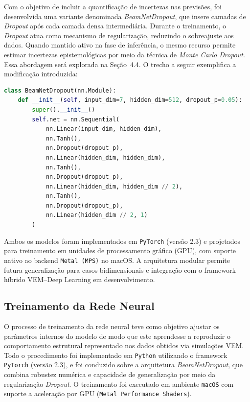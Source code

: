 \documentclass[12pt,openright,oneside,a4paper,english,brazil]{abntex2}
\begin{document}
Com o objetivo de incluir a quantificação de incertezas nas previsões, foi desenvolvida uma variante denominada \textit{BeamNetDropout}, que insere camadas de \textit{Dropout} após cada camada densa intermediária. Durante o treinamento, o \textit{Dropout} atua como mecanismo de regularização, reduzindo o sobreajuste aos dados. Quando mantido ativo na fase de inferência, o mesmo recurso 
permite estimar incertezas epistemológicas por meio da técnica de \textit{Monte Carlo Dropout}. Essa abordagem será explorada na Seção~4.4. O trecho a seguir exemplifica a modificação introduzida:

\begin{lstlisting}[language=Python, caption={Variante BeamNetDropout com regularização e suporte à quantificação de incerteza.}]
class BeamNetDropout(nn.Module):
    def __init__(self, input_dim=7, hidden_dim=512, dropout_p=0.05):
        super().__init__()
        self.net = nn.Sequential(
            nn.Linear(input_dim, hidden_dim),
            nn.Tanh(),
            nn.Dropout(dropout_p),
            nn.Linear(hidden_dim, hidden_dim),
            nn.Tanh(),
            nn.Dropout(dropout_p),
            nn.Linear(hidden_dim, hidden_dim // 2),
            nn.Tanh(),
            nn.Dropout(dropout_p),
            nn.Linear(hidden_dim // 2, 1)
        )
\end{lstlisting}

Ambos os modelos foram implementados em \texttt{PyTorch} (versão 2.3) e projetados para treinamento em unidades de processamento gráfico (GPU), com suporte nativo ao backend \texttt{Metal (MPS)} no macOS. A arquitetura modular permite futura generalização para casos bidimensionais e integração com o framework híbrido VEM–Deep Learning em desenvolvimento.

\subsection{Treinamento da Rede Neural}

O processo de treinamento da rede neural teve como objetivo ajustar os parâmetros internos do modelo de modo que este aprendesse a reproduzir o comportamento estrutural representado nos dados obtidos via simulações VEM. Todo o procedimento foi implementado em \texttt{Python} utilizando o framework \texttt{PyTorch} (versão 2.3), e foi conduzido sobre a arquitetura \textit{BeamNetDropout}, 
que combina robustez numérica e capacidade de generalização por meio da regularização \textit{Dropout}. O treinamento foi executado em ambiente \texttt{macOS} com suporte a aceleração por GPU (\texttt{Metal Performance Shaders}).
\end{document}
